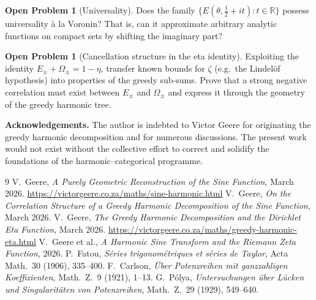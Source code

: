 \documentclass[11pt,a4paper]{article}
\theoremstyle{definition}
\newtheorem{problem}[theorem]{Open Problem}
\theoremstyle{remark}
\begin{document}
\begin{problem}[Universality]
Does the family \(\{E(\theta,\frac12+it):t\in\mathbb{R}\}\) possess universality \`a la Voronin?
That is, can it approximate arbitrary analytic functions on compact sets by shifting the imaginary part?
\end{problem}

\begin{problem}[Cancellation structure in the eta identity]
Exploiting the identity \(E_{\pm} + \Omega_{\pm} = 1-\eta\), transfer known bounds for \(\zeta\) (e.g.\ the Lindel\"of hypothesis) into properties of the greedy sub‑sums.
Prove that a strong negative correlation must exist between \(E_{\pm}\) and \(\Omega_{\pm}\) and express it through the geometry of the greedy harmonic tree.
\end{problem}

\vspace{1em}
\noindent\textbf{Acknowledgements.} The author is indebted to Victor Geere for originating the greedy harmonic decomposition and for numerous discussions.  The present work would not exist without the collective effort to correct and solidify the foundations of the harmonic–categorical programme.

\begin{thebibliography}{9}
V.~Geere, \emph{A Purely Geometric Reconstruction of the Sine Function}, March 2026.
\url{https://victorgeere.co.za/maths/sine-harmonic.html}
V.~Geere, \emph{On the Correlation Structure of a Greedy Harmonic Decomposition of the Sine Function}, March 2026.
V.~Geere, \emph{The Greedy Harmonic Decomposition and the Dirichlet Eta Function}, March 2026.
\url{https://victorgeere.co.za/maths/greedy-harmonic-eta.html}
V.~Geere et al., \emph{A Harmonic Sine Transform and the Riemann Zeta Function}, 2026.
P.~Fatou, \emph{S\'eries trigonom\'etriques et s\'eries de Taylor}, Acta Math.\ 30 (1906), 335--400.
F.~Carlson, \emph{\"Uber Potenzreihen mit ganzzahligen Koeffizienten}, Math.\ Z.\ 9 (1921), 1--13.
G.~P\'olya, \emph{Untersuchungen \"uber L\"ucken und Singularit\"aten von Potenzreihen}, Math.\ Z.\ 29 (1929), 549--640.
\end{thebibliography}
\end{document}
